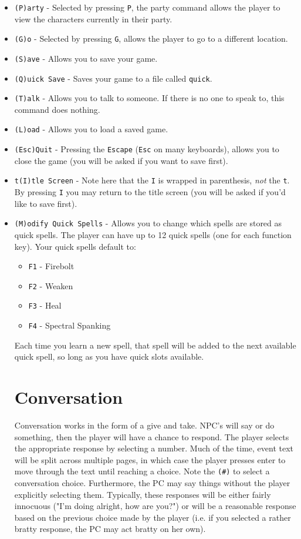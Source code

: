 \documentclass{report}
\begin{document}
    \begin{itemize}
    \item \verb|(P)arty| - Selected by pressing \verb|P|, the party command allows 
        the player to view the characters currently in their party.
    \item \verb|(G)o| - Selected by pressing \verb|G|, allows the player to go to
    a different location.
    \item \verb|(S)ave| - Allows you to save your game.
    \item \verb|(Q)uick Save| - Saves your game to a file called \verb|quick|.
    \item \verb|(T)alk| - Allows you to talk to someone. If there is no one to
        speak to, this command does nothing.
    \item \verb|(L)oad| - Allows you to load a saved game.
    \item \verb|(Esc)Quit| - Pressing the \verb|Escape| (\verb|Esc| on many 
    keyboards), allows you to close the game (you will be asked if you want to 
    save first).
    \item \verb|t(I)tle Screen| - Note here that the \verb|I| is wrapped in 
    parenthesis, \emph{not} the \verb|t|. By pressing \verb|I| you may return to
    the title screen (you will be asked if you'd like to save first).
\item \verb|(M)odify Quick Spells|  - Allows you to change which spells are stored as quick spells. The player can have up to 12 quick spells (one for each function key). Your quick spells default to:
    \begin{itemize}
        \item \verb|F1| - Firebolt
        \item \verb|F2| - Weaken
        \item \verb|F3| - Heal
        \item \verb|F4| - Spectral Spanking
    \end{itemize}
    Each time you learn a new spell, that spell will be added to the next available quick spell, so long as you have quick slots available.

\section{Conversation}
\label{sec_conversation}

    Conversation works in the form of a give and take. NPC's will say or do something, then the player will have a chance to respond. The player selects the appropriate
    response by selecting a number. Much of the time, event text will be split across multiple pages, in which case the player presses enter to move through the text 
    until reaching a choice. Note the \verb|(#)| to select a conversation choice. Furthermore, the PC may say things without the player explicitly selecting them.
    Typically, these responses will be either fairly innocuous ("I'm doing alright, how are you?") or will be a reasonable response based on the previous choice made by the
    player (i.e. if you selected a rather bratty response, the PC may act bratty on her own). 


\end{itemize}
\end{document}
